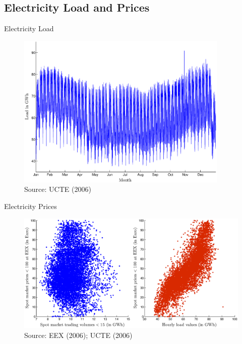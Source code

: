 \subsection{Electricity Load and Prices}

\begin{frame} {Electricity Load}
					
\begin{figure}[h]
\centering
\includegraphics[width=0.9\textwidth, angle=0]{loadvalues}
    \label{fig:load}   
\\ 
\vspace{0.1cm}
\scriptsize Source: UCTE (2006)           
\end{figure}
\end{frame}

\begin{frame} {Electricity Prices}				
\begin{figure}[h]
\centering
\includegraphics[width=1.0\textwidth, angle=0]{pricequant}
    \label{fig:load} 
\\ 
\vspace{0.1cm}
\scriptsize Source: EEX (2006); UCTE (2006)           
\end{figure}
\end{frame}

